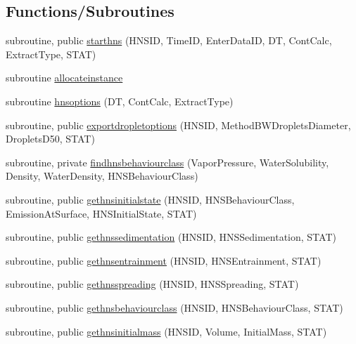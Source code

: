 \subsection*{Functions/\+Subroutines}
\begin{DoxyCompactItemize}
\item 
subroutine, public \mbox{\hyperlink{namespacemodulehns_a65e1246a501100818d485a4f330fa1d7}{starthns}} (H\+N\+S\+ID, Time\+ID, Enter\+Data\+ID, DT, Cont\+Calc, Extract\+Type, S\+T\+AT)
\item 
subroutine \mbox{\hyperlink{namespacemodulehns_a1ecdd29807e20a3d2a3ad0b9fc798f51}{allocateinstance}}
\item 
subroutine \mbox{\hyperlink{namespacemodulehns_a71301e39dc6614233febb77b7cd18194}{hnsoptions}} (DT, Cont\+Calc, Extract\+Type)
\item 
subroutine, public \mbox{\hyperlink{namespacemodulehns_a2dabe744302beb8c44eef0780790d14a}{exportdropletoptions}} (H\+N\+S\+ID, Method\+B\+W\+Droplets\+Diameter, Droplets\+D50, S\+T\+AT)
\item 
subroutine, private \mbox{\hyperlink{namespacemodulehns_a42753d96607d5c8c88073bec5ee71084}{findhnsbehaviourclass}} (Vapor\+Pressure, Water\+Solubility, Density, Water\+Density, H\+N\+S\+Behaviour\+Class)
\item 
subroutine, public \mbox{\hyperlink{namespacemodulehns_ade4bb11bbb379ee7bb16ff28af1174e6}{gethnsinitialstate}} (H\+N\+S\+ID, H\+N\+S\+Behaviour\+Class, Emission\+At\+Surface, H\+N\+S\+Initial\+State, S\+T\+AT)
\item 
subroutine, public \mbox{\hyperlink{namespacemodulehns_a7dda9b6f209c0922b44bc935eadbf01a}{gethnssedimentation}} (H\+N\+S\+ID, H\+N\+S\+Sedimentation, S\+T\+AT)
\item 
subroutine, public \mbox{\hyperlink{namespacemodulehns_a80a5a74cdd341402c42729e1ce18e7a5}{gethnsentrainment}} (H\+N\+S\+ID, H\+N\+S\+Entrainment, S\+T\+AT)
\item 
subroutine, public \mbox{\hyperlink{namespacemodulehns_a348f38143e5b2cd8130f996bf16a44a2}{gethnsspreading}} (H\+N\+S\+ID, H\+N\+S\+Spreading, S\+T\+AT)
\item 
subroutine, public \mbox{\hyperlink{namespacemodulehns_a9a3b41c5caabf304ae3d502e0c7fe6e7}{gethnsbehaviourclass}} (H\+N\+S\+ID, H\+N\+S\+Behaviour\+Class, S\+T\+AT)
\item 
subroutine, public \mbox{\hyperlink{namespacemodulehns_a256a2f0f1c2c0f036a40633b9605bf3d}{gethnsinitialmass}} (H\+N\+S\+ID, Volume, Initial\+Mass, S\+T\+AT)
\item 

\end{DoxyCompactItemize}
